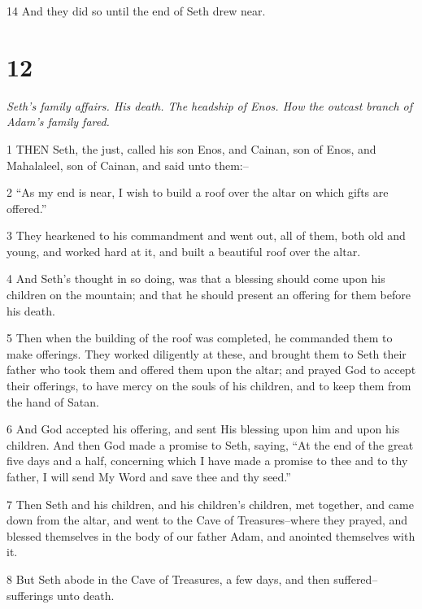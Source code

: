 \par 14 And they did so until the end of Seth drew near.

\chapter{12}

\par \textit{Seth's family affairs. His death. The headship of Enos. How the outcast branch of Adam's family fared.}

\par 1 THEN Seth, the just, called his son Enos, and Cainan, son of Enos, and Mahalaleel, son of Cainan, and said unto them:--

\par 2 “As my end is near, I wish to build a roof over the altar on which gifts are offered.”

\par 3 They hearkened to his commandment and went out, all of them, both old and young, and worked hard at it, and built a beautiful roof over the altar.

\par 4 And Seth's thought in so doing, was that a blessing should come upon his children on the mountain; and that he should present an offering for them before his death.

\par 5 Then when the building of the roof was completed, he commanded them to make offerings. They worked diligently at these, and brought them to Seth their father who took them and offered them upon the altar; and prayed God to accept their offerings, to have mercy on the souls of his children, and to keep them from the hand of Satan.

\par 6 And God accepted his offering, and sent His blessing upon him and upon his children. And then God made a promise to Seth, saying, “At the end of the great five days and a half, concerning which I have made a promise to thee and to thy father, I will send My Word and save thee and thy seed.”

\par 7 Then Seth and his children, and his children's children, met together, and came down from the altar, and went to the Cave of Treasures--where they prayed, and blessed themselves in the body of our father Adam, and anointed themselves with it.

\par 8 But Seth abode in the Cave of Treasures, a few days, and then suffered--sufferings unto death.

